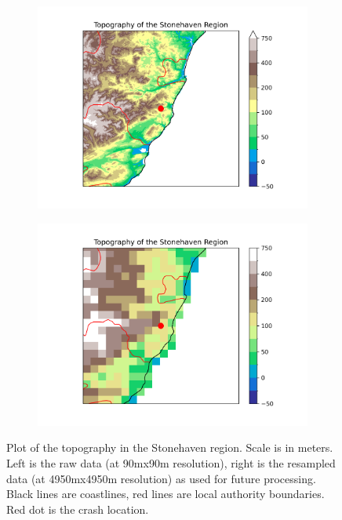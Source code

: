 \documentclass[12pt,a4paper]{report}
\begin{document}
\begin{figure}[H]
    \centering
    \begin{subfigure}{0.48\textwidth}
        \centering
        \includegraphics[width=\linewidth]{stonetopog90}
    \end{subfigure}
    \hfill
    \begin{subfigure}{0.48\textwidth}
        \centering
        \includegraphics[width=\linewidth]{stonetopog4950}
    \end{subfigure}
    \caption{Plot of the topography in the Stonehaven region.
    Scale is in meters.
    Left is the raw data (at 90mx90m resolution),
    right is the resampled data (at 4950mx4950m resolution) as used for future processing.
    Black lines are coastlines, red lines are local authority boundaries.
    Red dot is the crash location.}
    \label{fig:stonetopog}
\end{figure}
\end{document}
